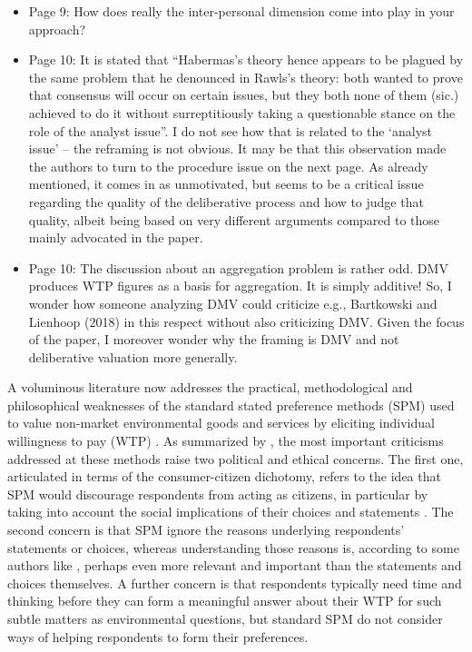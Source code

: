 \documentclass[version=3.21, pagesize, twoside=off, bibliography=totoc, DIV=calc, fontsize=12pt, a4paper, french, english]{scrartcl}
\begin{document}
{\begin{itemize}
		\item Page 9: How does really the inter-personal dimension come into play in your approach?
		\item Page 10: It is stated that “Habermas’s theory hence appears to be plagued by the same problem that he denounced in Rawls’s theory: both wanted to prove that consensus will occur on certain issues, but they both none of them (sic.) achieved to do it without surreptitiously taking a questionable stance on the role of the analyst issue”. I do not see how that is related to the ‘analyst issue’ – the reframing is not obvious.
	It may be that this observation made the authors to turn to the procedure issue on the next page. As already mentioned, it comes in as unmotivated, but seems to be a critical issue regarding the quality of the deliberative process and how to judge that quality, albeit being based on very different arguments compared to those mainly advocated in the paper.
		\item Page 10: The discussion about an aggregation problem is rather odd. DMV produces WTP figures as a basis for aggregation. It is simply additive! So, I wonder how someone analyzing DMV could criticize e.g., Bartkowski and Lienhoop (2018) in this respect without also criticizing DMV. Given the focus of the paper, I moreover wonder why the framing is DMV and not deliberative valuation more generally.
	\end{itemize}
}

A voluminous literature now addresses the practical, methodological and philosophical weaknesses of the standard stated preference methods (SPM) used to value non-market environmental goods and services by eliciting individual willingness to pay (WTP) \citep{meinard_ethical_2016} . 
As summarized by \citet{bartkowski_beyond_2018,bartkowski_deliberative_2019}, the most important criticisms addressed at these methods raise two political and ethical concerns. 
The first one, articulated in terms of the consumer-citizen dichotomy, refers to the idea that SPM would discourage respondents from acting as citizens, in particular by taking into account the social implications of their  choices and statements \citep{soma_representing_2014, vatn_institutional_2009}. 
The second concern is that SPM ignore the reasons underlying respondents' statements or choices, whereas understanding those reasons is, according to some authors like \citet{sen_environmental_1995}, perhaps even more relevant and important than the statements and choices themselves. A further concern is that respondents typically need time and thinking before they can form a meaningful answer about their WTP for such subtle matters as environmental questions, but standard SPM do not consider ways of helping respondents to form their preferences.
\end{document}
